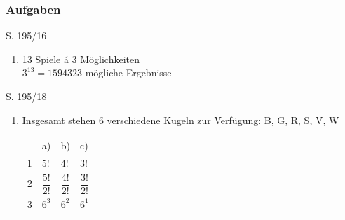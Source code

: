 
\subsubsection{Aufgaben}

\begin{Exercise}{S. 195/16}{}
\begin{enumerate}[leftmargin=*]
    \item [16.]{
        13 Spiele \'{a} 3 Möglichkeiten\\[1.0ex]
        $3^{13}=1594323$ mögliche Ergebnisse
    }
\end{enumerate}
\end{Exercise}
\pagebreak

\begin{Exercise}{S. 195/18}{}
\begin{enumerate}[leftmargin=*]
    \item [18.]{
        Insgesamt stehen 6 verschiedene Kugeln zur Verfügung: B, G, R, S, V, W\\[1.0ex]
        \begin{tabularx}{0.5\linewidth}{@{}l | X | X | X @{}}
            & a) & b) & c) \\[1.0ex]
            1 & $5!$ & $4!$ & $3!$ \\[1.5ex]
            2 & $\dfrac{5!}{2!}$ & $\dfrac{4!}{2!}$ & $\dfrac{3!}{2!}$\\[1.5ex]
            3 & $6^{3}$ & $6^{2}$ & $6^{1}$\\
        \end{tabularx}
    }
\end{enumerate}
\end{Exercise}


